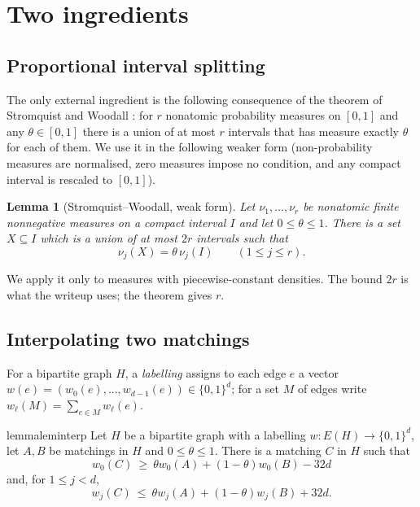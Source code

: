 \documentclass[11pt,a4paper]{article}
\theoremstyle{plain}
\newtheorem{lemma}[theorem]{Lemma}
\theoremstyle{definition}
\theoremstyle{remark}
\begin{document}
\section{Two ingredients}\label{sec:tools}

\subsection{Proportional interval splitting}

The only external ingredient is the following consequence of the theorem of Stromquist and Woodall \cite{SW85}: for $r$ nonatomic probability measures on $[0,1]$ and any $\theta\in[0,1]$ there is a union of at most $r$ intervals that has measure exactly $\theta$ for each of them. We use it in the following weaker form (non-probability measures are normalised, zero measures impose no condition, and any compact interval is rescaled to $[0,1]$).

\begin{lemma}[Stromquist--Woodall, weak form]\label{lem:SW}
Let $\nu_1,\dots,\nu_r$ be nonatomic finite nonnegative measures on a compact interval $I$ and let $0\le\theta\le1$. There is a set $X\subseteq I$ which is a union of at most $2r$ intervals such that
\[
 \nu_j(X)=\theta\,\nu_j(I)\qquad(1\le j\le r).
\]
\end{lemma}

We apply it only to measures with piecewise-constant densities. The bound $2r$ is what the writeup uses; the theorem gives $r$.

\subsection{Interpolating two matchings}

For a bipartite graph $H$, a \emph{labelling} assigns to each edge $e$ a vector $w(e)=(w_0(e),\dots,w_{d-1}(e))\in\{0,1\}^d$; for a set $M$ of edges write $w_\ell(M)=\sum_{e\in M}w_\ell(e)$.

\begin{restatable}{lemma}{leminterp}\label{lem:interp}
Let $H$ be a bipartite graph with a labelling $w:E(H)\to\{0,1\}^d$, let $A,B$ be matchings in $H$ and $0\le\theta\le1$. There is a matching $C$ in $H$ such that
\[
 w_0(C)\ \ge\ \theta w_0(A)+(1-\theta)w_0(B)-32d
\]
and, for $1\le j<d$,
\[
 w_j(C)\ \le\ \theta w_j(A)+(1-\theta)w_j(B)+32d .
\]
\end{restatable}
\end{document}
